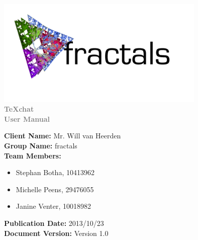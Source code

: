 \documentclass[11pt,a4paper]{moderncv}
\begin{document}
		\fontsize{36pt}{36pt}\selectfont
		\begin{center}
		\includegraphics[width=10cm]{./logo2.jpg}
			\textbf{\textcolor{gray}{\\TeXchat}}
			\textbf{\textcolor{gray}{\\User Manual}}
		\vspace*{\fill}
		\end{center}
		
		\fontsize{12pt}{12pt}\selectfont
		\textbf{Client Name:} Mr. Will van Heerden\\
		\textbf{Group Name:} fractals\\
		\textbf{Team Members:}
			\begin{itemize}
				\item Stephan Botha, 10413962
				\item Michelle Peens, 29476055
				\item Janine Venter, 10018982	
			\end{itemize}
		\textbf{Publication Date:} 2013/10/23\\
		\textbf{Document Version:} Version 1.0
		
\end{document}
